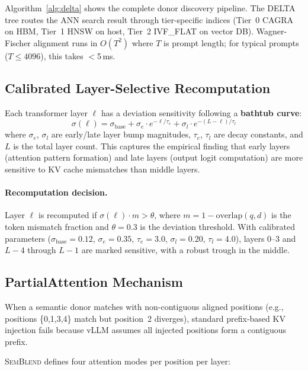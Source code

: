 \documentclass[11pt,twocolumn]{article}
\newcommand{\semblend}{\textsc{SemBlend}\xspace}
\begin{document}
Algorithm~\ref{alg:delta} shows the complete donor discovery pipeline.
The DELTA tree routes the ANN search result through tier-specific
indices (Tier~0 CAGRA on HBM, Tier~1 HNSW on host, Tier~2 IVF\_FLAT
on vector DB). Wagner-Fischer alignment runs in $O(T^2)$ where $T$ is
prompt length; for typical prompts ($T{\leq}4096$), this takes $<$5\,ms.


\subsection{Calibrated Layer-Selective Recomputation}
\label{sec:recomp}

Each transformer layer $\ell$ has a deviation sensitivity following a
\textbf{bathtub curve}:
\begin{equation}
  \sigma(\ell) = \sigma_\text{base} + \sigma_e \cdot e^{-\ell/\tau_e} + \sigma_l \cdot e^{-(L-\ell)/\tau_l}
  \label{eq:bathtub}
\end{equation}
where $\sigma_e$, $\sigma_l$ are early/late layer bump magnitudes,
$\tau_e$, $\tau_l$ are decay constants, and $L$ is the total layer
count. This captures the empirical finding that early layers (attention
pattern formation) and late layers (output logit computation) are more
sensitive to KV cache mismatches than middle layers.

\paragraph{Recomputation decision.} Layer $\ell$ is recomputed if
$\sigma(\ell) \cdot m > \theta$, where $m = 1 - \text{overlap}(q,d)$ is
the token mismatch fraction and $\theta = 0.3$ is the deviation threshold.
With calibrated parameters ($\sigma_\text{base}{=}0.12$,
$\sigma_e{=}0.35$, $\tau_e{=}3.0$, $\sigma_l{=}0.20$, $\tau_l{=}4.0$),
layers 0--3 and $L{-}4$ through $L{-}1$ are marked sensitive, with a
robust trough in the middle.


\subsection{PartialAttention Mechanism}
\label{sec:partial}

When a semantic donor matches with non-contiguous aligned positions
(e.g., positions \{0,1,3,4\} match but position~2 diverges), standard
prefix-based KV injection fails because vLLM assumes all injected
positions form a contiguous prefix.

\semblend defines four attention modes per position per layer:
\end{document}
